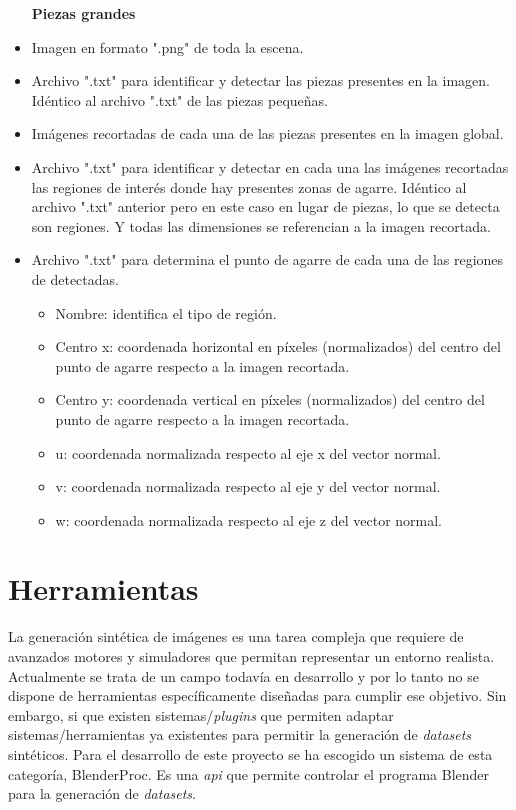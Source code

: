 \noindent
\begin{itemize}[wide, nosep, labelindent = 0pt, topsep = 1ex]
\item[\textbf{Piezas grandes}]
\item Imagen en formato ".png" de toda la escena.
\item Archivo ".txt" para identificar y detectar las piezas presentes en la imagen. Idéntico al archivo ".txt" de las piezas pequeñas.
\item Imágenes recortadas de cada una de las piezas presentes en la imagen global.
\item Archivo ".txt" para identificar y detectar en cada una las imágenes recortadas las regiones de interés donde hay presentes zonas de agarre. Idéntico al archivo ".txt" anterior pero en este caso en lugar de piezas, lo que se detecta son regiones. Y todas las dimensiones se referencian a la imagen recortada.
\item Archivo ".txt" para determina el punto de agarre de cada una de las regiones de  detectadas.
\begin{itemize}
\item Nombre: identifica el tipo de región.
\item Centro x: coordenada horizontal en píxeles (normalizados) del centro del punto de agarre respecto a la imagen recortada.
\item Centro y: coordenada vertical en píxeles (normalizados) del centro del punto de agarre respecto a la imagen recortada.
\item u: coordenada normalizada respecto al eje x del vector normal.
\item v: coordenada normalizada respecto al eje y del vector normal.
\item w: coordenada normalizada respecto al eje z del vector normal.
\end{itemize}
\end{itemize}

\section{Herramientas}
\label{chap:Generación de un dataset sec:Herramientas}
La generación sintética de imágenes es una tarea compleja que requiere de avanzados motores y simuladores que permitan representar un entorno realista. Actualmente se trata de un campo todavía en desarrollo y por lo tanto no se dispone de herramientas específicamente diseñadas para cumplir ese objetivo. Sin embargo, si que existen sistemas/\textit{plugins} que permiten adaptar sistemas/herramientas ya existentes para permitir la generación de \textit{datasets} sintéticos. Para el desarrollo de este proyecto se ha escogido un sistema de esta categoría, BlenderProc. Es una \textit{\ac{api}} que permite controlar el programa Blender para la generación de \textit{datasets}.

